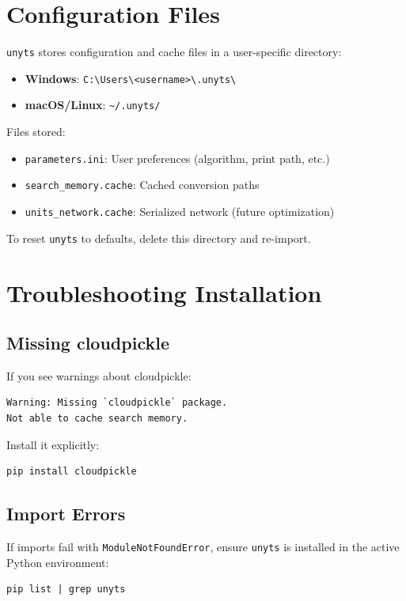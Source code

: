 \documentclass[11pt,a4paper]{report}
\begin{document}
\section{Configuration Files}

\texttt{unyts} stores configuration and cache files in a user-specific directory:
\begin{itemize}[leftmargin=*]
  \item \textbf{Windows}: \texttt{C:\textbackslash Users\textbackslash<username>\textbackslash .unyts\textbackslash}
  \item \textbf{macOS/Linux}: \texttt{\textasciitilde/.unyts/}
\end{itemize}

Files stored:
\begin{itemize}[leftmargin=*]
  \item \texttt{parameters.ini}: User preferences (algorithm, print path, etc.)
  \item \texttt{search\_memory.cache}: Cached conversion paths
  \item \texttt{units\_network.cache}: Serialized network (future optimization)
\end{itemize}

To reset \texttt{unyts} to defaults, delete this directory and re-import.

\section{Troubleshooting Installation}

\subsection{Missing cloudpickle}

If you see warnings about cloudpickle:
\begin{lstlisting}[style=bashstyle]
Warning: Missing `cloudpickle` package. 
Not able to cache search memory.
\end{lstlisting}

Install it explicitly:
\begin{lstlisting}[style=bashstyle]
pip install cloudpickle
\end{lstlisting}

\subsection{Import Errors}

If imports fail with \texttt{ModuleNotFoundError}, ensure \texttt{unyts} is installed in the active Python environment:
\begin{lstlisting}[style=bashstyle]
pip list | grep unyts
\end{lstlisting}
\end{document}
